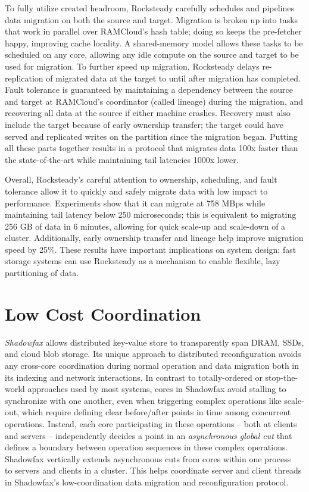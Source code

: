 To fully utilize created headroom, Rocksteady carefully schedules and
pipelines data migration on both the source and target.
%
Migration is
broken up into tasks that work in parallel over RAMCloud’s hash table;
doing so keeps the pre-fetcher happy, improving cache locality.
%
A shared-memory model allows these tasks to be scheduled on any core,
allowing any idle compute on the source and target to be used for
migration.
%
To further speed up migration, Rocksteady delays
re-replication of migrated data at the target to until after migration
has completed.
%
Fault tolerance is guaranteed by maintaining a dependency
between the source and target at RAMCloud’s coordinator (called lineage)
during the migration, and recovering all data at the source if either
machine crashes.
%
Recovery must also include the target because of early
ownership transfer; the target could have served and replicated writes
on the partition since the migration began.
%
Putting all these parts
together results in a protocol that migrates data 100x faster than the
state-of-the-art while maintaining tail latencies 1000x lower.

Overall, Rocksteady’s careful attention to ownership, scheduling, and
fault tolerance allow it to quickly and safely migrate data with low
impact to performance.
%
Experiments show that it can migrate at 758 MBps
while maintaining tail latency below 250 microseconds; this is
equivalent to migrating 256 GB of data in 6 minutes, allowing for quick
scale-up and scale-down of a cluster.
%
Additionally, early ownership transfer and
lineage help improve migration speed by 25\%.
%
These results have
important implications on system design; fast storage systems can use
Rocksteady as a mechanism to enable flexible, lazy partitioning of
data.

\section{Low Cost Coordination}

\emph{Shadowfax} allows distributed key-value store to
transparently span DRAM, SSDs, and cloud blob storage.
%
Its unique approach to
distributed reconfiguration avoids any cross-core coordination during
normal operation and data migration both in its indexing and network interactions.
%
In contrast to totally-ordered or stop-the-world approaches used by most
systems, cores in Shadowfax avoid stalling to synchronize with one another, even when
triggering complex operations like scale-out, which require
defining clear before/after points in time among concurrent operations.
%
Instead, each core participating in these operations -- both at clients and
servers -- independently decides a point in an \emph{asynchronous global
cut} that defines a boundary between operation sequences in these complex operations.
%
Shadowfax vertically extends asynchronous cuts from cores within one
process~\cite{faster} to servers
and clients in a cluster.
%
This helps coordinate server
and client threads
in Shadowfax's low-coordination data migration and
reconfiguration protocol.

